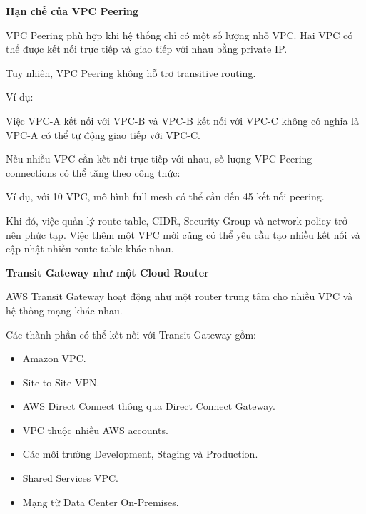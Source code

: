 \vspace{0.5em}\noindent\textbf{Hạn chế của VPC
Peering}\par

VPC Peering phù hợp khi hệ thống chỉ có một số lượng nhỏ VPC. Hai VPC có
thể được kết nối trực tiếp và giao tiếp với nhau bằng private IP.

Tuy nhiên, VPC Peering không hỗ trợ transitive routing.

Ví dụ:

\begin{Shaded}
\begin{Highlighting}[]
\end{Highlighting}
\end{Shaded}

Việc VPC-A kết nối với VPC-B và VPC-B kết nối với VPC-C không có nghĩa
là VPC-A có thể tự động giao tiếp với VPC-C.

Nếu nhiều VPC cần kết nối trực tiếp với nhau, số lượng VPC Peering
connections có thể tăng theo công thức:

\begin{Shaded}
\begin{Highlighting}[]
\end{Highlighting}
\end{Shaded}

Ví dụ, với 10 VPC, mô hình full mesh có thể cần đến 45 kết nối peering.

Khi đó, việc quản lý route table, CIDR, Security Group và network policy
trở nên phức tạp. Việc thêm một VPC mới cũng có thể yêu cầu tạo nhiều
kết nối và cập nhật nhiều route table khác nhau.

\vspace{0.5em}\noindent\textbf{Transit Gateway như một Cloud
Router}\par

AWS Transit Gateway hoạt động như một router trung tâm cho nhiều VPC và
hệ thống mạng khác nhau.

Các thành phần có thể kết nối với Transit Gateway gồm:

\begin{itemize}
\tightlist
\item
  Amazon VPC.
\item
  Site-to-Site VPN.
\item
  AWS Direct Connect thông qua Direct Connect Gateway.
\item
  VPC thuộc nhiều AWS accounts.
\item
  Các môi trường Development, Staging và Production.
\item
  Shared Services VPC.
\item
  Mạng từ Data Center On-Premises.
\end{itemize}

